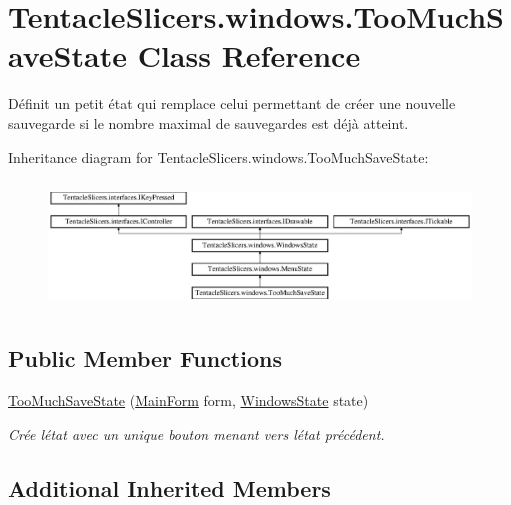 \hypertarget{class_tentacle_slicers_1_1windows_1_1_too_much_save_state}{}\section{Tentacle\+Slicers.\+windows.\+Too\+Much\+Save\+State Class Reference}
\label{class_tentacle_slicers_1_1windows_1_1_too_much_save_state}


Définit un petit état qui remplace celui permettant de créer une nouvelle sauvegarde si le nombre maximal de sauvegardes est déjà atteint.  


Inheritance diagram for Tentacle\+Slicers.\+windows.\+Too\+Much\+Save\+State\+:\begin{figure}[H]
\begin{center}
\leavevmode
\includegraphics[height=3.418803cm]{class_tentacle_slicers_1_1windows_1_1_too_much_save_state}
\end{center}
\end{figure}
\subsection*{Public Member Functions}
\begin{DoxyCompactItemize}
\item 
\hyperlink{class_tentacle_slicers_1_1windows_1_1_too_much_save_state_a9ebf16aeac5e087876440459e4715dfb}{Too\+Much\+Save\+State} (\hyperlink{class_tentacle_slicers_1_1windows_1_1_main_form}{Main\+Form} form, \hyperlink{class_tentacle_slicers_1_1windows_1_1_windows_state}{Windows\+State} state)
\begin{DoxyCompactList}\small\item\em Crée l\textquotesingle{}état avec un unique bouton menant vers l\textquotesingle{}état précédent. \end{DoxyCompactList}\end{DoxyCompactItemize}
\subsection*{Additional Inherited Members}


